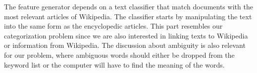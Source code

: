 The feature generator depends on  a text classifier that match documents with the most relevant articles of Wikipedia. The classifier starts by manipulating the text into the same form as the encyclopedic articles. This part resembles our categorization problem since we are also interested in linking texts to Wikipedia or information from Wikipedia.  The discussion about ambiguity is also relevant for our problem, where ambiguous words should either be dropped from the keyword list or the computer will have to find the meaning of the words. 
